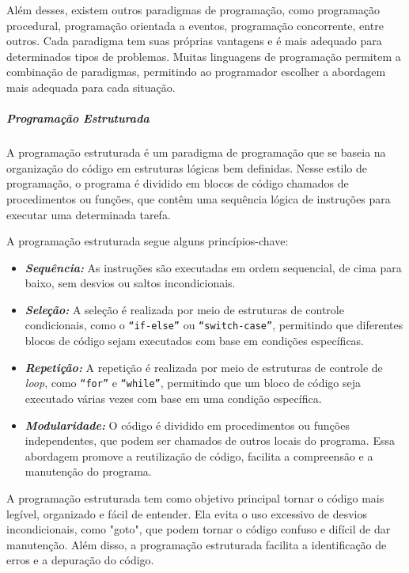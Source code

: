 \documentclass[a4paper, 12pt, onecolumn,singlespacing]{article}
\begin{document}
	Além desses, existem outros paradigmas de programação, como programação procedural, programação orientada a eventos, programação concorrente, entre outros. Cada paradigma tem suas próprias vantagens e é mais adequado para determinados tipos de problemas. Muitas linguagens de programação permitem a combinação de paradigmas, permitindo ao programador escolher a abordagem mais adequada para cada situação.
	
	\subparagraph{Programação Estruturada}
	\label{programacao_estruturada} A programação estruturada é um paradigma de programação que se baseia na organização do código em estruturas lógicas bem definidas. Nesse estilo de programação, o programa é dividido em blocos de código chamados de procedimentos ou funções, que contêm uma sequência lógica de instruções para executar uma determinada tarefa.
	
	A programação estruturada segue alguns princípios-chave:
	\begin{itemize}
		\item  \textbf{\textit{Sequência:}} As instruções são executadas em ordem sequencial, de cima para baixo, sem desvios ou saltos incondicionais.
		
		\item \textbf{\textit{Seleção:}} A seleção é realizada por meio de estruturas de controle condicionais, como o \texttt{``if-else''} ou \texttt{``switch-case''}, permitindo que diferentes blocos de código sejam executados com base em condições específicas.
		
		\item \textbf{\textit{Repetição:}} A repetição é realizada por meio de estruturas de controle de \textit{loop}, como \texttt{``for''} e \texttt{``while''}, permitindo que um bloco de código seja executado várias vezes com base em uma condição específica.
		
		\item \textbf{\textit{Modularidade:}} O código é dividido em procedimentos ou funções independentes, que podem ser chamados de outros locais do programa. Essa abordagem promove a reutilização de código, facilita a compreensão e a manutenção do programa.
		
	\end{itemize}
	
	A programação estruturada tem como objetivo principal tornar o código mais legível, organizado e fácil de entender. Ela evita o uso excessivo de desvios incondicionais, como "goto", que podem tornar o código confuso e difícil de dar manutenção. Além disso, a programação estruturada facilita a identificação de erros e a depuração do código.
	
\end{document}
